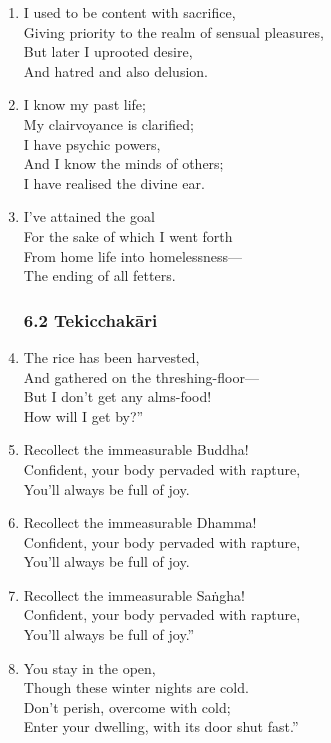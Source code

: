 \documentclass[10pt, openany]{book}
\newcommand*{\vleftofline}[1]{\leavevmode\llap{#1}}
\begin{document}
\begin{enumerate}
\item I used to be content with sacrifice,\\
Giving priority to the realm of sensual pleasures,\\
But later I uprooted desire,\\
And hatred and also delusion.

\item I know my past life;\\
My clairvoyance is clarified;\\
I have psychic powers, \\
And I know the minds of others;\\
I have realised the divine ear.

\item I’ve attained the goal\\
For the sake of which I went forth\\
From home life into homelessness—\\
The ending of all fetters.

\subsubsection*{6.2 Tekicchakāri}

\item \vleftofline{“}The rice has been harvested,\\
And gathered on the threshing-floor—\\
But I don’t get any alms-food!\\
How will I get by?”

\item \vleftofline{“}Recollect the immeasurable Buddha!\\
Confident, your body pervaded with rapture,\\
You’ll always be full of joy.

\item Recollect the immeasurable Dhamma!\\
Confident, your body pervaded with rapture,\\
You’ll always be full of joy.

\item Recollect the immeasurable Saṅgha!\\
Confident, your body pervaded with rapture,\\
You’ll always be full of joy.”

\item \vleftofline{“}You stay in the open,\\
Though these winter nights are cold.\\
Don’t perish, overcome with cold;\\
Enter your dwelling, with its door shut fast.”


\end{enumerate}
\end{document}
